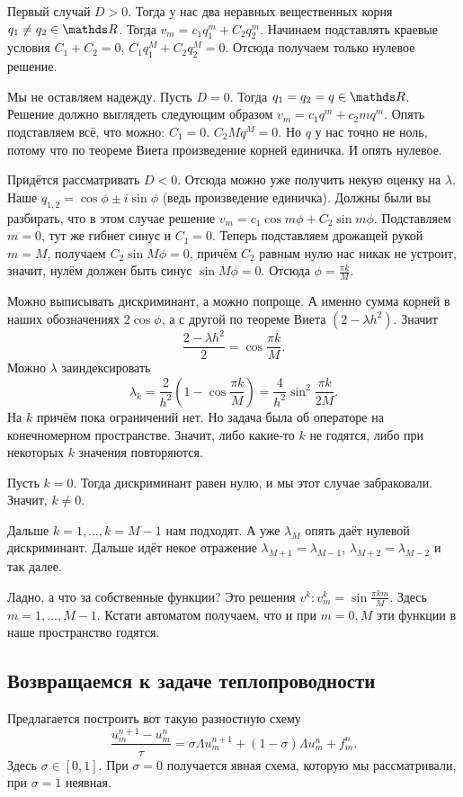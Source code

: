 Первый случай $D>0$. Тогда у нас два неравных вещественных корня $q_1\ne q_2\in \R$. Тогда $v_m = c_1 q_1^m + C_2 q_2^m$. Начинаем подставлять краевые условия $C_1+C_2 = 0$, $C_1 q_1^M + C_2 q_2^M = 0$. Отсюда получаем только нулевое решение.

Мы не оставляем надежду. Пусть $D=0$. Тогда $q_1=q_2 = q\in\R$. Решение должно выглядеть следующим образом $v_m = c_1 q^m + c_2 mq^m$. Опять подставляем всё, что можно: $C_1 = 0$. $C_2 Mq^M =0$. Но $q$ у нас точно не ноль, потому что по теореме Виета произведение корней единичка. И опять нулевое.

Придётся рассматривать $D<0$. Отсюда можно уже получить некую оценку на $\lambda$. Наше $q_{1,2} = \cos\phi\pm i\sin\phi$ (ведь произведение единичка). Должны были вы разбирать, что в этом случае решение $v_m = c_1 \cos m\phi + C_2\sin m\phi$. Подставляем $m=0$, тут же гибнет синус и $C_1=0$. Теперь подставляем дрожащей рукой $m=M$, получаем $C_2 \sin M\phi = 0$, причём $C_2$ равным нулю нас никак не устроит, значит, нулём должен быть синус $\sin M\phi = 0$. Отсюда $\phi = \frac{\pi k}M$.

Можно выписывать дискриминант, а можно попроще. А именно сумма корней в наших обозначениях $2\cos\phi$, а с другой по теореме Виета $(2-\lambda h^2)$. Значит
\[
  \frac{2 - \lambda h^2}{2} = \cos\frac{\pi k}M.
\]
Можно $\lambda$ заиндексировать
\[
  \lambda_k = \frac2{h^2} \left(1 - \cos\frac{\pi k}M\right) = \frac4{h^2} \sin^2\frac{\pi k}{2M}.
\]
На $k$ причём пока ограничений нет. Но задача была об операторе на конечномерном пространстве. Значит, либо какие-то $k$ не годятся, либо при некоторых $k$ значения повторяются.

Пусть $k=0$. Тогда дискриминант равен нулю, и мы этот случае забраковали. Значит, $k\ne 0$.

Дальше $k=1,\dots,k=M-1$ нам подходят. А уже $\lambda_M$ опять даёт нулевой дискриминант. Дальше идёт некое отражение $\lambda_{M+1} = \lambda_{M-1}$, $\lambda_{M+2} = \lambda_{M-2}$ и так далее.

Ладно, а что за собственные функции? Это решения $v^k\colon v^k_m = \sin\frac{\pi k m}{M}$. Здесь $m=1,\dots,M-1$.
Кстати автоматом получаем, что и при $m=0,M$ эти функции в наше пространство годятся.


\subsection{Возвращаемся к задаче теплопроводности}
Предлагается построить вот такую разностную схему
\[
  \frac{ u_m^{n+1} - u_m^n}{\tau} = \sigma \Lambda u_m^{n+1} + (1-\sigma) \Lambda u_m^n + f_m^n.
\]
Здесь $\sigma\in[0,1]$. При $\sigma=0$ получается явная схема, которую мы рассматривали, при $\sigma=1$ неявная.


